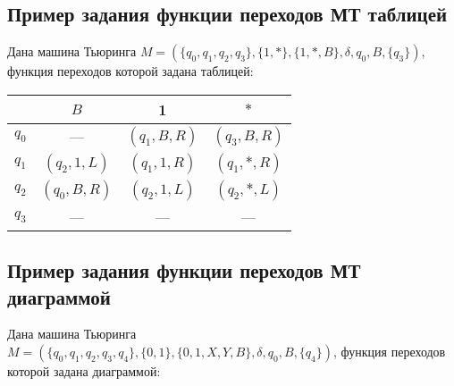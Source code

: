 \documentclass[12pt,a4paper]{article}
\newcommand{\tol}{\shortleftarrow}
\newcommand{\tor}{\shortrightarrow}
\newcommand{\tra}[3]{{\scriptsize $#1/#2\!#3$}}
\begin{document}
\subsection*{Пример задания функции переходов  МТ таблицей}

 Дана машина Тьюринга
$M=\left(\{q_0, q_1, q_2, q_3\},\{1,*\},\{1,*,B\},\delta,q_0,B,\{q_3\}\right)$, функция
переходов которой задана таблицей:
\begin{center}
  \begin{tabular}[t]{c||c|c|c}
     & $B$ & 1 & $*$\\
    \hline\hline
    $q_0$ & --- &$(q_1,B,R)$& $(q_3,B,R)$\\
    $q_1$ &$(q_2,1,L)$  &$(q_1,1,R)$& $(q_1,*,R)$\\
    $q_2$ &$(q_0,B,R)$  &$(q_2,1,L)$& $(q_2,*,L)$\\
    $q_3$ & --- & --- & ---
  \end{tabular}
  
\end{center}


\subsection*{Пример задания функции переходов  МТ диаграммой}

Дана машина Тьюринга 
$M=\left(\{q_0, q_1, q_2, q_3, q_4\},\{0, 1\},\{0,1,X,Y,B\},\delta,q_0,B,\{q_4\}\right)$,
функция переходов которой задана диаграммой:

\begin{center}
\end{center}
\end{document}
